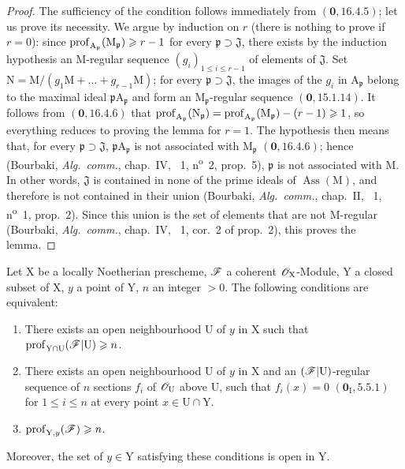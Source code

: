 \begin{proof}
The sufficiency of the condition follows immediately from $(\mathbf{0},16.4.5)$; let us prove its necessity. We argue by induction on $r$ (there is nothing to prove if $r=0$): since $\operatorname{prof}_{\mathrm{A}_\mathfrak{p}}(\mathrm{M}_\mathfrak{p})\geqslant r- 1$ for every $\mathfrak{p}\supset\mathfrak{J}$, there exists by the induction hypothesis an M-regular sequence $(g_i)_{1\leqslant i\leqslant r-1}$ of elements of $\mathfrak{J}$. Set $\mathrm{N}=\mathrm{M}/(g_1\mathrm{M}+\ldots+g_{r-1}\mathrm{M})$; for every $\mathfrak{p}\supset\mathfrak{J}$, the images of the $g_i$ in $\mathrm{A}_\mathfrak{p}$ belong to the maximal ideal $\mathfrak{p}\mathrm{A}_\mathfrak{p}$ and form an $\mathrm{M}_\mathfrak{p}$-regular sequence $(\mathbf{0},15.1.14)$. It follows from $(\mathbf{0},16.4.6)$ that $\operatorname{prof}_{\mathrm{A}_\mathfrak{p}}(\mathrm{N}_\mathfrak{p})=\operatorname{prof}_{\mathrm{A}_\mathfrak{p}}(\mathrm{M}_\mathfrak{p})-(r- 1)\geqslant 1$, so everything reduces to proving the lemma for $r=1$. The hypothesis then means that, for every $\mathfrak{p}\supset\mathfrak{J}$, $\mathfrak{p}\mathrm{A}_\mathfrak{p}$ is not associated with $\mathrm{M}_\mathfrak{p}$ $(\mathbf{0},16.4.6)$; hence (Bourbaki, \emph{Alg.~comm.}, chap.~IV, \textsection~1, n\textsuperscript{o}~2, prop.~5), $\mathfrak{p}$ is not associated with $\mathrm{M}$. In other words, $\mathfrak{J}$ is contained in none of the prime ideals of $\operatorname{Ass}(\mathrm{M})$, and therefore is not contained in their union (Bourbaki, \emph{Alg.~comm.}, chap.~II, \textsection~1, n\textsuperscript{o}~1, prop.~2). Since this union is the set of elements that are not M-regular (Bourbaki, \emph{Alg.~comm.}, chap.~IV, \textsection~1, cor.~2 of prop.~2), this proves the lemma.
\end{proof}

\begin{proposition}[19.9.3]
\label{IV.19.9.3}
Let $\mathrm{X}$ be a locally Noetherian prescheme, $\mathscr{F}$ a coherent $\mathscr{O}_\mathrm{X}$-Module, $\mathrm{Y}$ a closed subset of $\mathrm{X}$, $y$ a point of $\mathrm{Y}$, $n$ an integer $>0$. The following conditions are equivalent:
\begin{enumerate}
\item[\rm a)] There exists an open neighbourhood $\mathrm{U}$ of $y$ in $\mathrm{X}$ such that $\operatorname{prof}_{\mathrm{Y}\cap\mathrm{U}}(\mathscr{F}|\mathrm{U})\geqslant n$.
\item[\rm b)] There exists an open neighbourhood $\mathrm{U}$ of $y$ in $\mathrm{X}$ and an $(\mathscr{F}|\mathrm{U})$-regular sequence of $n$ sections $f_i$ of $\mathscr{O}_\mathrm{U}$ above $\mathrm{U}$, such that $f_i(x)=0$ $(\mathbf{0}_\mathrm{I},5.5.1)$ for $1\leqslant i\leqslant n$ at every point $x\in\mathrm{U}\cap\mathrm{Y}$.
\item[\rm c)] $\operatorname{prof}_{\mathrm{Y},y}(\mathscr{F})\geqslant n$.
\end{enumerate}

Moreover, the set of $y\in\mathrm{Y}$ satisfying these conditions is open in $\mathrm{Y}$.
\end{proposition}

